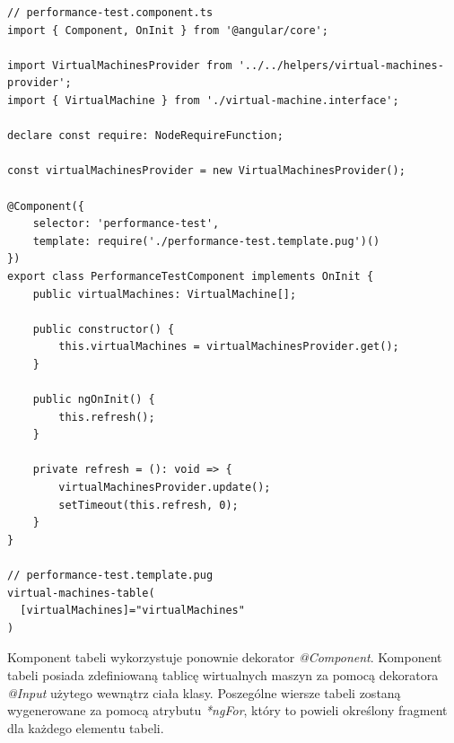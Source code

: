 \documentclass[polish, twoside, 12pt]{mwart}
\begin{document}
\begin{lstlisting}[caption=Główny komponent]
// performance-test.component.ts
import { Component, OnInit } from '@angular/core';

import VirtualMachinesProvider from '../../helpers/virtual-machines-provider';
import { VirtualMachine } from './virtual-machine.interface';

declare const require: NodeRequireFunction;

const virtualMachinesProvider = new VirtualMachinesProvider();

@Component({
    selector: 'performance-test',
    template: require('./performance-test.template.pug')()
})
export class PerformanceTestComponent implements OnInit {
    public virtualMachines: VirtualMachine[];

    public constructor() {
        this.virtualMachines = virtualMachinesProvider.get();
    }

    public ngOnInit() {
        this.refresh();
    }

    private refresh = (): void => {
        virtualMachinesProvider.update();
        setTimeout(this.refresh, 0);
    }
}

// performance-test.template.pug
virtual-machines-table(
  [virtualMachines]="virtualMachines"
)
\end{lstlisting}

Komponent tabeli wykorzystuje ponownie dekorator \emph{@Component}. Komponent tabeli posiada zdefiniowaną tablicę wirtualnych maszyn za pomocą dekoratora \emph{@Input} użytego wewnątrz ciała klasy. Poszególne wiersze tabeli zostaną wygenerowane za pomocą atrybutu \emph{*ngFor}, który to powieli określony fragment dla każdego elementu tabeli.
\end{document}

